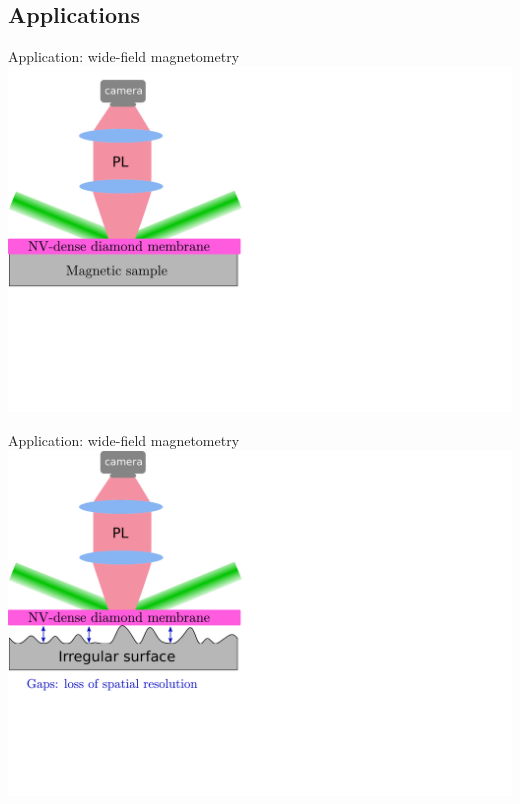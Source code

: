 \documentclass{beamer}
\begin{document}
\subsection{Applications}
\begin{frame}{Application: wide-field magnetometry}
\centering
\includegraphics[width=\textwidth,height=0.85\textheight,keepaspectratio]{Slide_applications_wide_field_f-3}
\end{frame}

\begin{frame}{Application: wide-field magnetometry}
\centering
\includegraphics[width=\textwidth,height=0.85\textheight,keepaspectratio]{Slide_applications_wide_field_f-2}
\end{frame}
\end{document}
